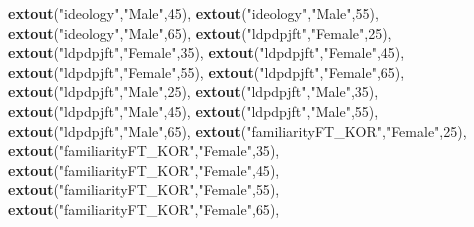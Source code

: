 \documentclass[
]{article}
\newenvironment{Shaded}{\begin{snugshade}}{\end{snugshade}}
\newcommand{\DecValTok}[1]{\textcolor[rgb]{0.00,0.00,0.81}{#1}}
\newcommand{\KeywordTok}[1]{\textcolor[rgb]{0.13,0.29,0.53}{\textbf{#1}}}
\newcommand{\NormalTok}[1]{#1}
\newcommand{\StringTok}[1]{\textcolor[rgb]{0.31,0.60,0.02}{#1}}
\begin{document}
\begin{Shaded}
\begin{Highlighting}[]
               \KeywordTok{extout}\NormalTok{(}\StringTok{"ideology"}\NormalTok{,}\StringTok{"Male"}\NormalTok{,}\DecValTok{45}\NormalTok{),}
               \KeywordTok{extout}\NormalTok{(}\StringTok{"ideology"}\NormalTok{,}\StringTok{"Male"}\NormalTok{,}\DecValTok{55}\NormalTok{),}
               \KeywordTok{extout}\NormalTok{(}\StringTok{"ideology"}\NormalTok{,}\StringTok{"Male"}\NormalTok{,}\DecValTok{65}\NormalTok{),}
               \KeywordTok{extout}\NormalTok{(}\StringTok{"ldpdpjft"}\NormalTok{,}\StringTok{"Female"}\NormalTok{,}\DecValTok{25}\NormalTok{),}
               \KeywordTok{extout}\NormalTok{(}\StringTok{"ldpdpjft"}\NormalTok{,}\StringTok{"Female"}\NormalTok{,}\DecValTok{35}\NormalTok{),}
               \KeywordTok{extout}\NormalTok{(}\StringTok{"ldpdpjft"}\NormalTok{,}\StringTok{"Female"}\NormalTok{,}\DecValTok{45}\NormalTok{),}
               \KeywordTok{extout}\NormalTok{(}\StringTok{"ldpdpjft"}\NormalTok{,}\StringTok{"Female"}\NormalTok{,}\DecValTok{55}\NormalTok{),}
               \KeywordTok{extout}\NormalTok{(}\StringTok{"ldpdpjft"}\NormalTok{,}\StringTok{"Female"}\NormalTok{,}\DecValTok{65}\NormalTok{),}
               \KeywordTok{extout}\NormalTok{(}\StringTok{"ldpdpjft"}\NormalTok{,}\StringTok{"Male"}\NormalTok{,}\DecValTok{25}\NormalTok{),}
               \KeywordTok{extout}\NormalTok{(}\StringTok{"ldpdpjft"}\NormalTok{,}\StringTok{"Male"}\NormalTok{,}\DecValTok{35}\NormalTok{),}
               \KeywordTok{extout}\NormalTok{(}\StringTok{"ldpdpjft"}\NormalTok{,}\StringTok{"Male"}\NormalTok{,}\DecValTok{45}\NormalTok{),}
               \KeywordTok{extout}\NormalTok{(}\StringTok{"ldpdpjft"}\NormalTok{,}\StringTok{"Male"}\NormalTok{,}\DecValTok{55}\NormalTok{),}
               \KeywordTok{extout}\NormalTok{(}\StringTok{"ldpdpjft"}\NormalTok{,}\StringTok{"Male"}\NormalTok{,}\DecValTok{65}\NormalTok{),}
               \KeywordTok{extout}\NormalTok{(}\StringTok{"familiarityFT_KOR"}\NormalTok{,}\StringTok{"Female"}\NormalTok{,}\DecValTok{25}\NormalTok{),}
               \KeywordTok{extout}\NormalTok{(}\StringTok{"familiarityFT_KOR"}\NormalTok{,}\StringTok{"Female"}\NormalTok{,}\DecValTok{35}\NormalTok{),}
               \KeywordTok{extout}\NormalTok{(}\StringTok{"familiarityFT_KOR"}\NormalTok{,}\StringTok{"Female"}\NormalTok{,}\DecValTok{45}\NormalTok{),}
               \KeywordTok{extout}\NormalTok{(}\StringTok{"familiarityFT_KOR"}\NormalTok{,}\StringTok{"Female"}\NormalTok{,}\DecValTok{55}\NormalTok{),}
               \KeywordTok{extout}\NormalTok{(}\StringTok{"familiarityFT_KOR"}\NormalTok{,}\StringTok{"Female"}\NormalTok{,}\DecValTok{65}\NormalTok{),}

\end{Highlighting}
\end{Shaded}
\end{document}
